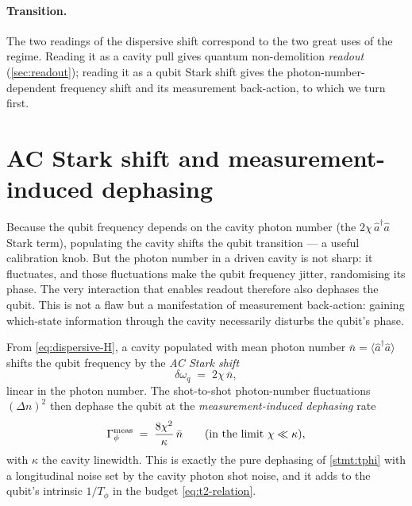 \paragraph{Transition.}
The two readings of the dispersive shift correspond to the two great
uses of the regime. Reading it as a cavity pull gives quantum
non-demolition \emph{readout} (\cref{sec:readout}); reading it as a
qubit Stark shift gives the photon-number-dependent frequency shift
and its measurement back-action, to which we turn first.

\section{AC Stark shift and measurement-induced dephasing}
\label{sec:ac-stark}

\begin{phenomenon}
Because the qubit frequency depends on the cavity photon number
(the $2\chi\,\hat a^\dagger\hat a$ Stark term), populating the
cavity shifts the qubit transition --- a useful calibration knob.
But the photon number in a driven cavity is not sharp: it
fluctuates, and those fluctuations make the qubit frequency jitter,
randomising its phase. The very interaction that enables readout
therefore also dephases the qubit. This is not a flaw but a
manifestation of measurement back-action: gaining
which-state information through the cavity necessarily disturbs the
qubit's phase.
\end{phenomenon}

\begin{statement}
\label{stmt:ac-stark}
From \cref{eq:dispersive-H}, a cavity populated with mean photon
number $\bar n=\langle\hat a^\dagger\hat a\rangle$ shifts the qubit
frequency by the \emph{AC Stark shift}
\begin{equation}
\label{eq:ac-stark}
\delta\omega_q \;=\; 2\chi\,\bar n,
\end{equation}
linear in the photon number. The shot-to-shot photon-number
fluctuations $(\Delta n)^2$ then dephase the qubit at the
\emph{measurement-induced dephasing} rate
\begin{equation}
\label{eq:meas-dephasing}
\Gamma_\phi^{\rm meas} \;=\; \frac{8\chi^2}{\kappa}\,\bar n
\qquad(\text{in the limit }\chi\ll\kappa),
\end{equation}
with $\kappa$ the cavity linewidth. This is exactly the pure
dephasing of \cref{stmt:tphi} with a longitudinal noise set by the
cavity photon shot noise, and it adds to the qubit's intrinsic
$1/T_\phi$ in the budget \cref{eq:t2-relation}.
\end{statement}

